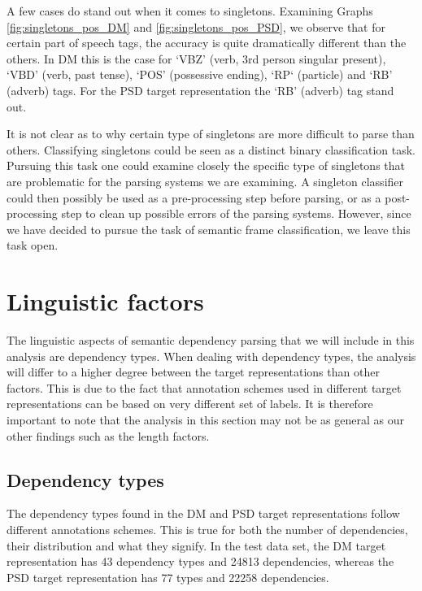 A few cases do stand out when it comes to singletons. Examining Graphs \ref{fig:singletons_pos_DM} and \ref{fig:singletons_pos_PSD}, we observe that for certain part of speech tags, the accuracy is quite dramatically different than the others. In DM this is the case for `VBZ' (verb, 3rd person singular present), `VBD' (verb, past tense), `POS' (possessive ending), `RP` (particle) and `RB' (adverb) tags. For the PSD target representation the `RB' (adverb) tag stand out. 

It is not clear as to why certain type of singletons are more difficult to parse than others. Classifying singletons could be seen as a distinct binary classification task. Pursuing this task one could examine closely the specific type of singletons that are problematic for the parsing systems we are examining. A singleton classifier could then possibly be used as a pre-processing step before parsing, or as a post-processing step to clean up possible errors of the parsing systems. However, since we have decided to pursue the task of semantic frame classification, we leave this task open.









\section{Linguistic factors}

The linguistic aspects of semantic dependency parsing that we will include in this analysis are dependency types. When dealing with dependency types, the analysis will differ to a higher degree between the target representations than other factors. This is due to the fact that annotation schemes used in different target representations can be based on very different set of labels. It is therefore important to note that the analysis in this section may not be as general as our other findings such as the length factors.

\subsection{Dependency types}

The dependency types found in the DM and PSD target representations follow different annotations schemes. This is true for both the number of dependencies, their distribution and what they signify. In the test data set, the DM target representation has 43 dependency types and 24813 dependencies, whereas the PSD target representation has 77 types and 22258 dependencies.

